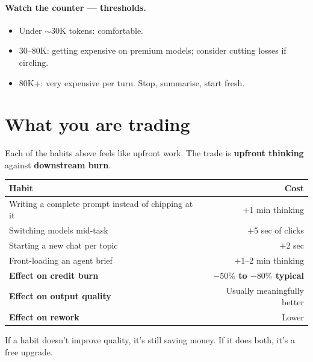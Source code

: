 \documentclass[11pt,a4paper]{article}
\begin{document}
\paragraph{Watch the counter --- thresholds.}
\begin{itemize}
  \item Under $\sim$30K tokens: comfortable.
  \item 30--80K: getting expensive on premium models; consider cutting losses if circling.
  \item 80K+: very expensive per turn. Stop, summarise, start fresh.
\end{itemize}

\section{What you are trading}\label{sec:trading}

Each of the habits above feels like upfront work. The trade is \textbf{upfront thinking} against \textbf{downstream burn}.

\begin{table}[h]
\centering\small
\begin{tabular}{@{}L{6.5cm}r@{}}
\toprule
\textbf{Habit} & \textbf{Cost} \\
\midrule
Writing a complete prompt instead of chipping at it & $+$1 min thinking \\
Switching models mid-task                            & $+$5 sec of clicks \\
Starting a new chat per topic                        & $+$2 sec \\
Front-loading an agent brief                         & $+$1--2 min thinking \\
\midrule
\textbf{Effect on credit burn}                       & \textcolor{successgreen}{\textbf{$-50\%$ to $-80\%$ typical}} \\
\textbf{Effect on output quality}                    & Usually meaningfully better \\
\textbf{Effect on rework}                            & Lower \\
\bottomrule
\end{tabular}
\end{table}

If a habit doesn't improve quality, it's still saving money. If it does both, it's a free upgrade.

\end{document}
